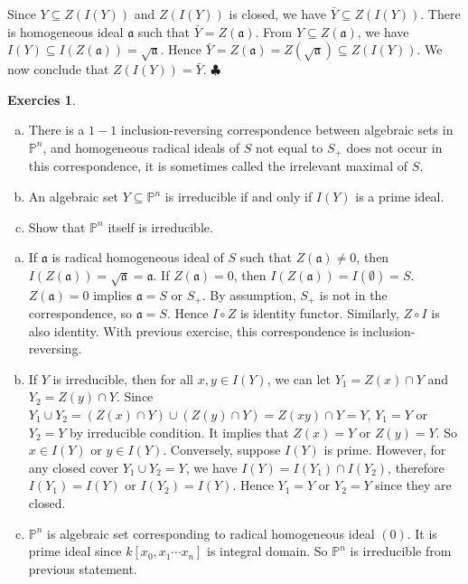 \documentclass[12pt,a4paper]{article}
\theoremstyle{definition}
\newtheorem{exer}{Exercies}[section]
\newcommand*{\qeds}{\hfill\ensuremath{\clubsuit}}
\begin{document}
Since $Y \subseteq Z(I(Y))$ and $Z(I(Y))$ is closed, we have $\bar{Y} \subseteq Z(I(Y))$. There is homogeneous ideal $\mathfrak{a}$ such that $\bar{Y} = Z(\mathfrak{a})$. From $Y \subseteq Z(\mathfrak{a})$, we have $I(Y) \subseteq I(Z(\mathfrak{a})) = \sqrt{\mathfrak{a}}$. Hence $\bar{Y}= Z(\mathfrak{a}) = Z(\sqrt{\mathfrak{a}}) \subseteq Z(I(Y))$. We now conclude that $Z(I(Y))= \bar{Y}$.
\qeds
\begin{exer}
	\begin{enumerate}[a)]
	\item There is a $1-1$ inclusion-reversing correspondence between algebraic sets in $\mathbb{P}^n$, and homogeneous radical ideals of $S$ not equal to $S_+$ does not occur in this correspondence, it is sometimes called the irrelevant maximal of $S$.
	\item An algebraic set $Y \subseteq \mathbb{P}^n$ is irreducible if and only if $I(Y)$ is a prime ideal.
	\item Show that $\mathbb{P}^n$ itself is irreducible.
	\end{enumerate}
\end{exer}
\begin{enumerate}[a)]
	\item If $\mathfrak{a}$ is radical homogeneous ideal of $S$ such that $Z(\mathfrak{a}) \neq 0$, then $I(Z(\mathfrak{a})) = \sqrt{\mathfrak{a}} =\mathfrak{a}$. If $Z(\mathfrak{a})=0$, then $I(Z(\mathfrak{a}))= I(\emptyset) = S$. $Z(\mathfrak{a}) =0$ implies $\mathfrak{a}= S$ or $S_+$. By assumption, $S_+$ is not in the correspondence, so $\mathfrak{a}= S$. Hence $I \circ Z$ is identity functor. Similarly, $Z \circ I$ is also identity. With previous exercise, this correspondence is inclusion-reversing.
	\item If $Y$ is irreducible, then for all $x,y \in I(Y)$, we can let $Y_1= Z(x) \cap Y$ and $Y_2 = Z(y) \cap Y$. Since $Y_1 \cup Y_2 = (Z(x) \cap Y) \cup (Z(y)\cap Y)= Z(xy) \cap Y = Y$, $Y_1= Y$ or $Y_2=Y$ by irreducible condition. It implies that $Z(x)=Y$ or $Z(y)=Y$. So $x \in I(Y)$ or $y \in I(Y)$. Conversely, suppose $I(Y)$ is prime. However, for any closed cover $Y_1 \cup Y_2 =Y$, we have $I(Y)= I(Y_1) \cap I(Y_2)$, therefore $I(Y_1)=I(Y)$ or $I(Y_2)=I(Y)$. Hence $Y_1 = Y$ or $Y_2 =Y$ since they are closed.
	\item $\mathbb{P}^n$ is algebraic set corresponding to radical homogeneous ideal $(0)$. It is prime ideal since $k[x_0, x_1 \cdots x_n]$ is integral domain. So $\mathbb{P}^n$ is irreducible from previous statement.
	\end{enumerate}
\end{document}

